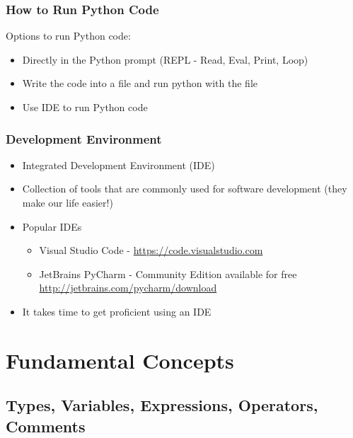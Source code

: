 \documentclass[10pt, a4paper]{beamer} %
\begin{document}
\begin{frame}[fragile,c]\frametitle{How to Run Python Code}

	\begin{block}{Options to run Python code:}
		\begin{itemize}
			\item Directly in the Python prompt (REPL - Read, Eval, Print, Loop)
			\item Write the code into a file and run python with the file
			\item Use IDE to run Python code
		\end{itemize}
	\end{block}

\end{frame}

\begin{frame}[c]\frametitle{Development Environment}

	\begin{itemize}
		\item Integrated Development Environment (IDE)
		\item Collection of tools that are commonly used for software development (they make our life easier!)
		\item Popular IDEs
		      \begin{itemize}
			      \item Visual Studio Code - \url{https://code.visualstudio.com}
			      \item JetBrains PyCharm - Community Edition available for free \url{http://jetbrains.com/pycharm/download}
		      \end{itemize}
		\item It takes time to get proficient using an IDE
	\end{itemize}
\end{frame}


\section{Fundamental Concepts} %
\label{sec:fundamental_concepts}

\subsection{Types, Variables, Expressions, Operators, Comments} %
\label{sub:Types_variables_expressions_operators_comments}
\end{document}
